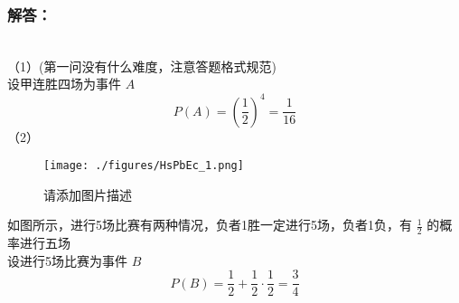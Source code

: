 \subsubsection{解答：}\\
（1）(第一问没有什么难度，注意答题格式规范)\\
设甲连胜四场为事件 $A$
\begin{equation}
P(A) = (\frac{1}{2})^4 = \frac{1}{16}
\end{equation}
（2）
\begin{figure}[ht]
\centering
\texttt{[image: ./figures/HsPbEc\_1.png]}
\caption{请添加图片描述} \label{HsPbEc_fig1}
\end{figure}
如图所示，进行5场比赛有两种情况，负者1胜一定进行5场，负者1负，有 $\frac{1}{2}$ 的概率进行五场\\
设进行5场比赛为事件 $B$
\begin{equation}
P(B) = \frac{1}{2} + \frac{1}{2} \cdot \frac{1}{2} = \frac{3}{4}
\end{equation}
